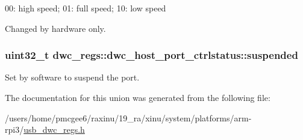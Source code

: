 00\-: high speed; 01\-: full speed; 10\-: low speed

Changed by hardware only. \hypertarget{uniondwc__regs_1_1dwc__host__port__ctrlstatus_a5fdcc742ffa9ea28bbc916f2ff80d3e4}{
\subsubsection[{suspended}]{\setlength{\rightskip}{0pt plus 5cm}uint32\-\_\-t dwc\-\_\-regs\-::dwc\-\_\-host\-\_\-port\-\_\-ctrlstatus\-::suspended}}\label{uniondwc__regs_1_1dwc__host__port__ctrlstatus_a5fdcc742ffa9ea28bbc916f2ff80d3e4}
Set by software to suspend the port. 

The documentation for this union was generated from the following file\-:\begin{DoxyCompactItemize}
\item 
/users/home/pmcgee6/raxinu/19\-\_\-ra/xinu/system/platforms/arm-\/rpi3/\hyperlink{usb__dwc__regs_8h}{usb\-\_\-dwc\-\_\-regs.\-h}\end{DoxyCompactItemize}
